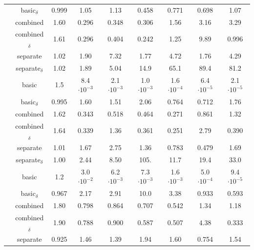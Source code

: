 \begin{table}[H]
\begin{tabular}{|c|c|ccccccc|}
        \cline{2-9}
        \cellcolor{white}
        & basic$_\delta$ & 0.999 & 1.05 & 1.13 & 0.458 & 0.771 & 0.698 & 1.07 \\
        \cellcolor{white}
        & combined & 1.60 & 0.296 & 0.348 & 0.306 & 1.56 & 3.16 & 3.29 \\
        \cellcolor{white}
        & combined$_\delta$ & 1.61 & 0.296 & 0.404 & 0.242 & 1.25 & 9.89 & 0.996 \\
        \cellcolor{white}
        & separate & 1.02 & 1.90 & 7.32 & 1.77 & 4.72 & 1.76 & 4.29 \\
        \cellcolor{white}
        \multirow{-6}{*}{0.2\%}
        & separate$_\delta$ & 1.02 & 1.89 & 5.04 & 14.9 & 65.1 & 89.4 & 81.2 \\
        \hline
        \hline
        \rowcolor[gray]{.9}
        \cellcolor{white}
        & basic & 1.5 & 8.4$\cdot 10^{-3}$ & 2.1$\cdot 10^{-3}$ & 1.0$\cdot 10^{-3}$ & 1.6$\cdot 10^{-4}$ & 6.4$\cdot 10^{-5}$ & 2.1$\cdot 10^{-5 }$ \\
        \cline{2-9}
        \cellcolor{white}
        & basic$_\delta$ & 0.995 & 1.60 & 1.51 & 2.06 & 0.764 & 0.712 & 1.76 \\
        \cellcolor{white}
        & combined & 1.62 & 0.343 & 0.518 & 0.464 & 0.271 & 0.861 & 1.32 \\
        \cellcolor{white}
        & combined$_\delta$ & 1.64 & 0.339 & 1.36 & 0.361 & 0.251 & 2.79 & 0.390 \\
        \cellcolor{white}
        & separate & 1.01 & 1.67 & 2.75 & 1.36 & 0.783 & 0.479 & 1.69 \\
        \cellcolor{white}
        \multirow{-6}{*}{1\%}
        & separate$_\delta$ & 1.00 & 2.44 & 8.50 & 105. & 11.7 & 19.4 & 33.0 \\
        \hline
        \hline
        \rowcolor[gray]{.9}
        \cellcolor{white}
        & basic & 1.2 & 3.0$\cdot 10^{-2}$ & 6.2$\cdot 10^{-3}$ & 7.3$\cdot 10^{-3}$ & 1.6$\cdot 10^{-3}$ & 5.0$\cdot 10^{-4}$ & 9.4$\cdot 10^{-5 }$ \\
        \cline{2-9}
        \cellcolor{white}
        & basic$_\delta$ & 0.967 & 2.17 & 2.91 & 10.0 & 3.38 & 0.933 & 0.593 \\
        \cellcolor{white}
        & combined & 1.80 & 0.798 & 0.864 & 0.707 & 0.542 & 1.34 & 1.18 \\
        \cellcolor{white}
        & combined$_\delta$ & 1.90 & 0.788 & 0.900 & 0.587 & 0.507 & 4.38 & 0.333 \\
        \cellcolor{white}
        & separate & 0.925 & 1.46 & 1.39 & 1.94 & 1.60 & 0.754 & 1.54 \\

\end{tabular}
\end{table}
